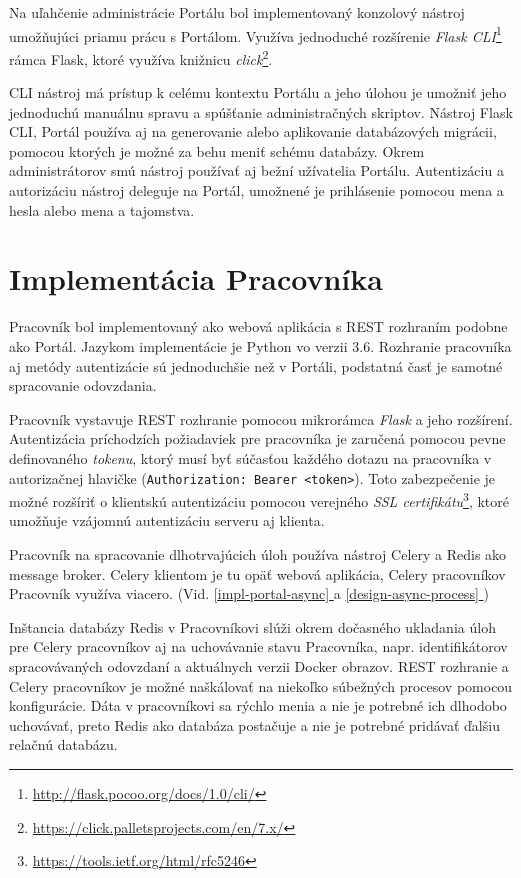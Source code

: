 \documentclass[
  digital, %
  twoside, %
  table,   %
  lof,     %
  lot,     %
]{fithesis3}
\newcommand*{\fullref}[1]{\hyperref[{#1}]{\autoref*{#1} \nameref*{#1}}}
\newcommand*{\footurl}[1]{\footnote{\url{#1}}}
\begin{document}
Na uľahčenie administrácie Portálu bol implementovaný konzolový nástroj umožňujúci priamu prácu s Portálom.  Využíva jednoduché rozšírenie \emph{Flask CLI}\footnote{\url{http://flask.pocoo.org/docs/1.0/cli/}} rámca Flask, ktoré využíva knižnicu \emph{click}\footurl{https://click.palletsprojects.com/en/7.x/}. 

CLI nástroj má prístup k celému kontextu Portálu a jeho úlohou je umožniť jeho jednoduchú manuálnu spravu a spúšťanie administračných skriptov. Nástroj Flask CLI, Portál používa aj na generovanie alebo aplikovanie databázových migrácii, pomocou ktorých je možné za behu meniť schému databázy. Okrem administrátorov smú nástroj používať aj bežní užívatelia Portálu. Autentizáciu a autorizáciu nástroj deleguje na Portál, umožnené je prihlásenie pomocou mena a hesla alebo mena a tajomstva.

\section{Implementácia Pracovníka}

Pracovník bol implementovaný ako webová aplikácia s REST rozhraním podobne ako Portál. Jazykom implementácie je Python vo verzii 3.6. Rozhranie pracovníka aj metódy autentizácie sú jednoduchšie než v Portáli, podstatná časť je samotné spracovanie odovzdania.

Pracovník vystavuje REST rozhranie pomocou mikrorámca \emph{Flask} a jeho rozšírení. Autentizácia príchodzích požiadaviek pre pracovníka je zaručená pomocou pevne definovaného \emph{tokenu}, ktorý musí byť súčasťou každého dotazu na pracovníka v autorizačnej hlavičke (\texttt{Authorization: Bearer <token>}). Toto zabezpečenie je možné rozšíriť o klientskú autentizáciu pomocou verejného \emph{SSL certifikátu}\footurl{https://tools.ietf.org/html/rfc5246}, ktoré umožňuje vzájomnú autentizáciu serveru aj klienta. 

Pracovník na spracovanie dlhotrvajúcich úloh používa nástroj Celery a Redis ako message broker. Celery klientom je tu opäť webová aplikácia, Celery pracovníkov Pracovník využíva viacero. (Vid. \fullref{impl-portal-async} a \fullref{design-async-process})

Inštancia databázy Redis v Pracovníkovi slúži okrem dočasného ukladania úloh pre Celery pracovníkov aj na uchovávanie stavu Pracovníka, napr. identifikátorov spracovávaných odovzdaní a aktuálnych verzii Docker obrazov. REST rozhranie a Celery pracovníkov je možné naškálovať na niekoľko súbežných procesov pomocou konfigurácie. Dáta v pracovníkovi sa rýchlo menia a nie je potrebné ich dlhodobo uchovávať, preto Redis ako databáza postačuje a nie je potrebné pridávať ďalšiu relačnú databázu.
\end{document}

